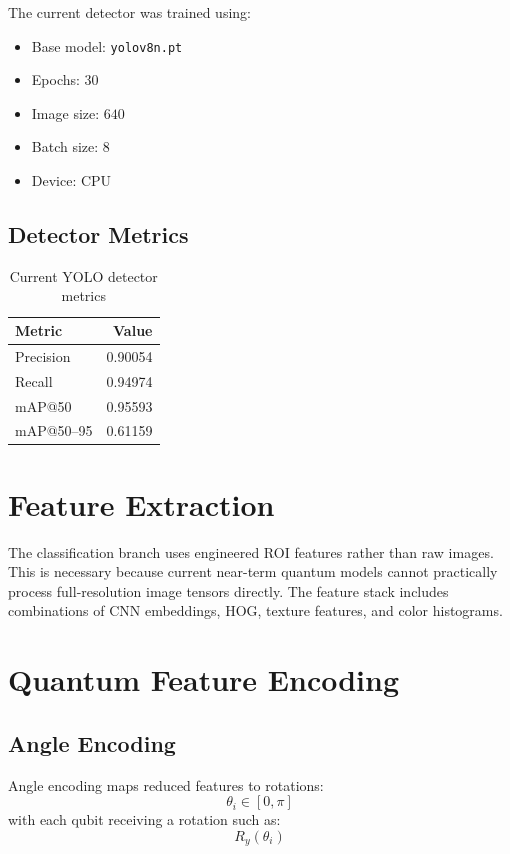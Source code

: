\documentclass[12pt,a4paper]{article}
\begin{document}
The current detector was trained using:
\begin{itemize}
  \item Base model: \texttt{yolov8n.pt}
  \item Epochs: \(30\)
  \item Image size: \(640\)
  \item Batch size: \(8\)
  \item Device: CPU
\end{itemize}

\subsection{Detector Metrics}

\begin{table}[h!]
\centering
\begin{tabular}{lr}
\toprule
Metric & Value \\
\midrule
Precision & 0.90054 \\
Recall & 0.94974 \\
mAP@50 & 0.95593 \\
mAP@50--95 & 0.61159 \\
\bottomrule
\end{tabular}
\caption{Current YOLO detector metrics}
\end{table}

\section{Feature Extraction}

The classification branch uses engineered ROI features rather than raw images. This is necessary because current near-term quantum models cannot practically process full-resolution image tensors directly. The feature stack includes combinations of CNN embeddings, HOG, texture features, and color histograms.

\section{Quantum Feature Encoding}

\subsection{Angle Encoding}

Angle encoding maps reduced features to rotations:
\[
\theta_i \in [0,\pi]
\]
with each qubit receiving a rotation such as:
\[
R_y(\theta_i)
\]
\end{document}
